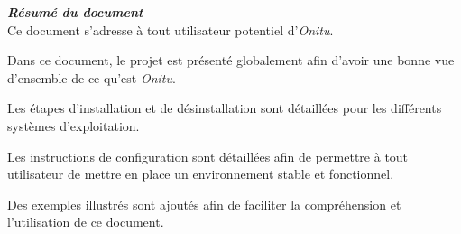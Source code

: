 \thispagestyle{empty}
\vspace*{10mm}

\textbf{\emph{\textcolor{onitu}{\large{Résumé du document} } } }\\

Ce document s'adresse à tout utilisateur potentiel d'\emph{Onitu}.

Dans ce document, le projet est présenté globalement afin d'avoir une bonne vue d'ensemble de ce qu'est \emph{Onitu}.

Les étapes d'installation et de désinstallation sont détaillées pour les différents systèmes d'exploitation.

Les instructions de configuration sont détaillées afin de permettre à tout utilisateur de mettre en place un environnement stable et fonctionnel.

Des exemples illustrés sont ajoutés afin de faciliter la compréhension et l'utilisation de ce document.

\clearpage
